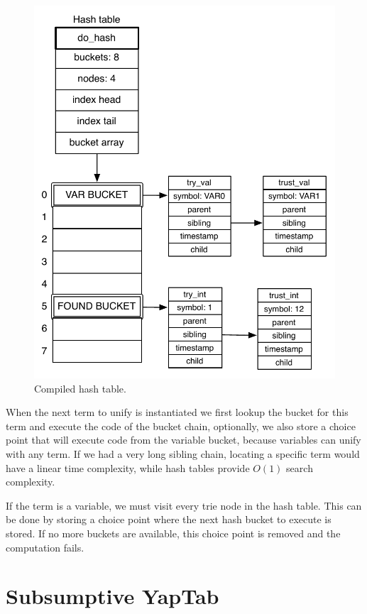 \begin{figure}[H]
  \centering
    \includegraphics[scale=0.6]{compiled_hash.pdf}
  \caption{Compiled hash table.}
  \label{fig:compiled_hash}
\end{figure}

When the next term to unify is instantiated we first lookup the bucket for this
term and execute the code of the bucket chain, optionally, we also store a choice point that will
execute code from the variable bucket, because variables can unify with any term. If we had
a very long sibling chain, locating a specific term would have a linear time complexity, while
hash tables provide $O(1)$ search complexity.

If the term is a variable, we must visit every trie node in the hash table. This can be done
by storing a choice point where the next hash bucket to execute is stored. If no more
buckets are available, this choice point is removed and the computation fails.

\section{Subsumptive YapTab}

